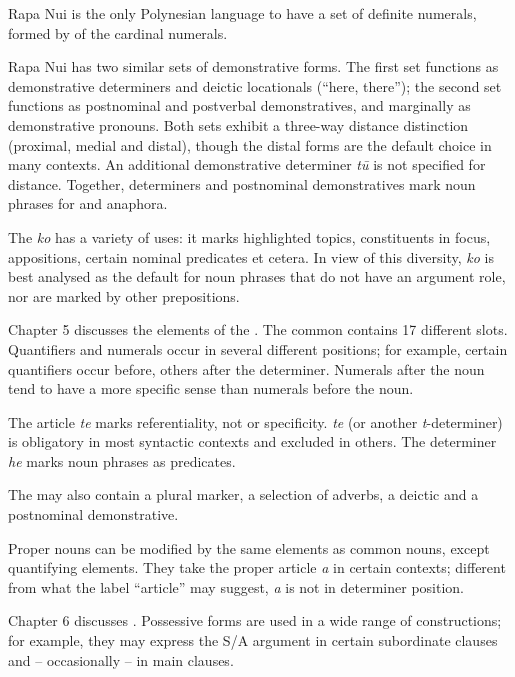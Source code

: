 Rapa Nui is the only Polynesian language to have a set of definite numerals, formed by  of the cardinal numerals. 

Rapa Nui has two similar sets of demonstrative forms. The first set functions as demonstrative determiners and deictic locationals (“here, there”); the second set functions as postnominal and postverbal demonstratives, and marginally as demonstrative pronouns. Both sets exhibit a three-way distance distinction (proximal, medial and distal), though the distal forms are the default choice in many contexts. An additional demonstrative determiner \textit{tū} is not specified for distance. Together, determiners and postnominal demonstratives mark noun phrases for  and anaphora.

The  \textit{ko} has a variety of uses: it marks highlighted topics, constituents in focus, appositions, certain nominal predicates et cetera. In view of this diversity, \textit{ko} is best analysed as the default  for noun phrases that do not have an argument role, nor are marked by other prepositions.

\medskip Chapter 5 discusses the elements of the . The common  contains 17 different slots. Quantifiers and numerals occur in several different positions; for example, certain quantifiers occur before, others after the determiner. Numerals after the noun tend to have a more specific sense than numerals before the noun.

The article \textit{te} marks referentiality, not  or specificity. \textit{te} (or another \textit{t}{}-determiner) is obligatory in most syntactic contexts and excluded in others. The determiner \textit{he} marks noun phrases as predicates.

The  may also contain a plural marker, a selection of adverbs, a deictic  and a postnominal demonstrative. 

Proper nouns can be modified by the same elements as common nouns, except quantifying elements. They take the proper article \textit{a} in certain contexts; different from what the label “article” may suggest, \textit{a} is not in determiner position. 

\medskip Chapter 6 discusses . Possessive forms are used in a wide range of constructions; for example, they may express the S/A argument in certain subordinate clauses and – occasionally – in main clauses. 


